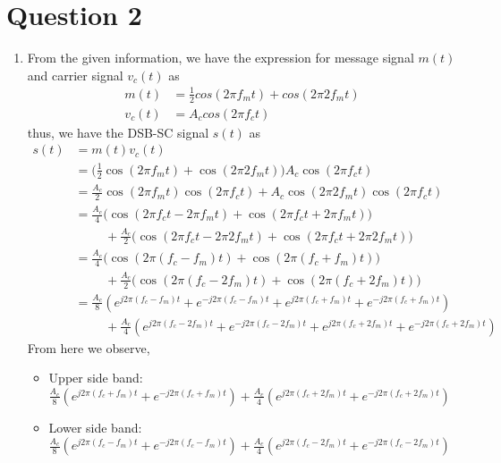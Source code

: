 \documentclass[11pt]{article}
\begin{document}
\section*{Question 2}
\begin{enumerate}[label=(\alph*)]
\item From the given information, we have the expression for message signal $m(t)$ and carrier signal $v_c(t)$ as
    \begin{align*}
    m(t) &= \frac{1}{2} cos(2 \pi f_m t)+cos(2\pi 2 f_m t)\\
    v_c(t) &= A_c cos(2\pi f_c t)
    \end{align*}
thus, we have the DSB-SC signal $s(t)$ as
    \begin{align*}
    s(t) &=m(t)v_c(t) \\
    &= \biggr( \frac{1}{2} \cos(2 \pi f_m t)+\cos(2\pi 2 f_m t)\biggr )A_c \cos(2\pi f_c t)\\
    &=\frac{A_c}{2} \cos(2 \pi f_m t) \cos(2\pi f_c t)+ A_c \cos(2\pi 2 f_m t)\cos(2\pi f_c t)  \\
    &=\frac{A_c}{4}\biggr(\cos(2\pi f_c t - 2\pi f_m t) + \cos(2\pi f_c t + 2\pi f_m t) \biggr)\\ 
    &\hspace{1cm} + \frac{A_c}{2}\biggr( \cos(2\pi f_c t - 2\pi 2f_m t) + \cos(2\pi f_c t + 2\pi 2f_m t) \biggr)\\
    &= \frac{A_c}{4}\biggr(\cos(2\pi (f_c -f_m)t)+ \cos(2\pi (f_c +f_m)t) \biggr)\\
    &\hspace{1cm} + \frac{A_c}{2}\biggr( \cos(2\pi (f_c -2f_m)t)+ \cos(2\pi (f_c +2f_m)t) \biggr)\\
    &= \frac{A_c}{8} (e^{j2\pi (f_c-f_m) t}+e^{-j2\pi (f_c-f_m) t}+e^{j2\pi (f_c+f_m) t}+e^{-j2\pi (f_c+f_m) t})\\
    &\hspace{1cm} +\frac{A_c}{4}(e^{j2\pi (f_c - 2f_m) t}+e^{-j2\pi (f_c - 2f_m) t}+e^{j2\pi (f_c + 2f_m) t}+e^{-j2\pi (f_c+2f_m) t})
    \end{align*}
From here we observe,
\begin{itemize}
    \item %
    Upper side band: $\frac{A_c}{8} (e^{j2\pi (f_c+f_m)t} +  e^{-j2\pi (f_c+f_m)t}) + \frac{A_c}{4}(e^{j2\pi (f_c+2f_m)t} + e^{-j2\pi (f_c+2f_m)t})$
    \item %
    Lower side band: $\frac{A_c}{8} (e^{j2\pi(f_c-f_m)t} +  e^{-j2\pi (f_c-f_m)t}) + \frac{A_c}{4}(e^{j2\pi (f_c-2f_m)t} + e^{-j2\pi (f_c-2f_m)t})$

\end{itemize}
\end{enumerate}
\end{document}
